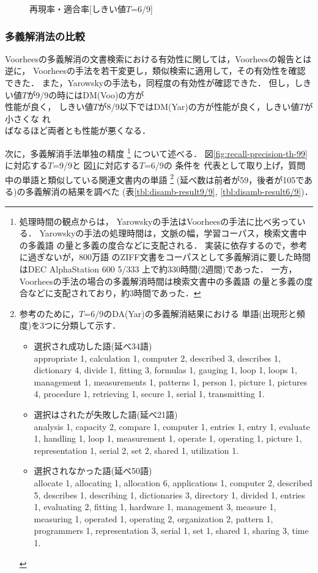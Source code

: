 \begin{figure}
 
 \centerline{}
 \caption{再現率・適合率[しきい値$T$=6/9]}
 \label{fig:recall-precision-th-69}
\end{figure}

\clearpage
\subsubsection{多義解消法の比較}\label{sec:vy}
Voorheesの多義解消の文書検索における有効性に関しては，Voorheesの報告とは逆に，
Voorheesの手法を若干変更し，類似検索に適用して，その有効性を確認できた．
また，Yarowskyの手法も，同程度の有効性が確認できた．
但し，しきい値$T$が9/9の時にはDM(Voo)の方が\\性能が良く，
しきい値$T$が8/9以下ではDM(Yar)の方が性能が良く，しきい値$T$が小さくな
れ\\ばなるほど両者とも性能が悪くなる．

  次に，多義解消手法単独の精度
\footnote{処理時間の観点からは，
Yarowskyの手法はVoorheesの手法に比べ劣っている．
Yarowskyの手法の処理時間は，文脈の幅，学習コーパス，検索文書中の多義語
の量と多義の度合などに支配される．
実装に依存するので，参考に過ぎないが，800万語
のZIFF文書をコーパスとして多義解消に要した時間はDEC AlphaStation 600 5/333
上で約330時間(2週間)であった．
一方，Voorheesの手法の場合の多義解消時間は検索文書中の多義語
の量と多義の度合などに支配されており，約3時間であった．}
について述べる．
  図\ref{fig:recall-precision-th-99}に対応する$T$=9/9と
  図\ref{fig:recall-precision-th-69}に対応する$T$=6/9の
  条件を
  代表として取り上げ，質問中の単語と類似している関連文書内の単語
\footnote{参考のために，$T$=6/9のDA(Yar)の多義解消結果における 
単語(出現形と頻度)を3つに分類して示す．
\begin{itemize}
\topsep=0mm
\partopsep=0mm
\parskip=0mm
\parsep=0mm
\itemsep=0mm
\item 選択され成功した語(延べ34語)\\
appropriate 1,
calculation 1,
computer 2,
described 3,
describes 1,
dictionary 4,
divide 1,
fitting 3,
formulas 1,
gauging 1,
loop 1,
loops 1,
management 1,
measurements 1,
patterns 1,
person 1,
picture 1,
pictures 4,
procedure 1,
retrieving 1,
secure 1,
serial 1,
transmitting 1.
\item 選択はされたが失敗した語(延べ21語)\\
analysis 1,
capacity 2,
compare 1,
computer 1,
entries 1,
entry 1,
evaluate 1,
handling 1,
loop 1,
measurement 1,
operate 1,
operating 1,
picture 1,
representation 1,
serial 2,
set 2,
shared 1,
utilization 1.
\item 選択されなかった語(延べ50語)\\
allocate 1,
allocating 1,
allocation 6,
applications 1,
computer 2,
described 5,
describes 1,
describing 1,
dictionaries 3,
directory 1,
divided 1,
entries 1,
evaluating 2,
fitting 1,
hardware 1,
management 3,
measure 1,
measuring 1,
operated 1,
operating 2,
organization 2,
pattern 1,
programmers 1,
representation 3,
serial 1,
set 1,
shared 1,
sharing 3,
time 1.
\end{itemize}
}
(延べ数は前者が59，後者が105である)の多義解消の結果を調べた
(表\ref{tbl:disamb-result9/9}, \ref{tbl:disamb-result6/9})．

